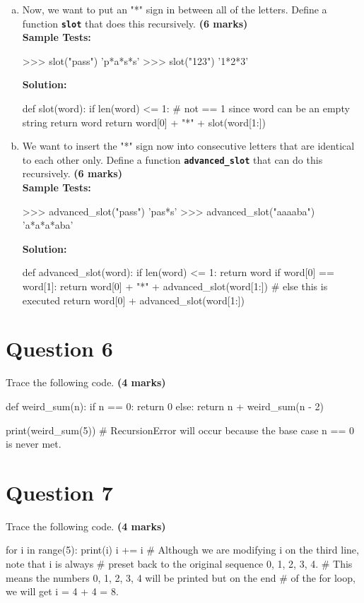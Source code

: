 \begin{enumerate}[(a)]
\item Now, we want to put an "*" sign in between all of the letters. Define a function \texttt{\bfseries slot}
that does this recursively. \textbf{(6 marks)} \\
\textbf{Sample Tests:}
\begin{python}
>>> slot("pass")
'p*a*s*s'
>>> slot("123")
'1*2*3'
\end{python}
\textbf{Solution:}
\begin{python}
def slot(word):
    if len(word) <= 1: # not == 1 since word can be an empty string
        return word
    return word[0] + "*" + slot(word[1:])
\end{python}

\item We want to insert the "*" sign now into consecutive letters that are identical to each
other only. Define a function \texttt{\bfseries advanced\_slot} that can do this recursively. \textbf{(6 marks)} \\
\textbf{Sample Tests:}
\begin{python}
>>> advanced_slot("pass")
'pas*s'
>>> advanced_slot("aaaaba")
'a*a*a*aba'
\end{python}
\textbf{Solution:}
\begin{python}
def advanced_slot(word):
    if len(word) <= 1:
        return word
    if word[0] == word[1]:
        return word[0] + "*" + advanced_slot(word[1:])
    # else this is executed
    return word[0] + advanced_slot(word[1:])
\end{python}
\end{enumerate}

\section{Question 6}
Trace the following code. \textbf{(4 marks)}
\begin{python}
def weird_sum(n):
    if n == 0:
        return 0 
    else:
        return n + weird_sum(n - 2)

print(weird_sum(5))
# RecursionError will occur because the base case n == 0 is never met.
\end{python}

\section{Question 7}
Trace the following code. \textbf{(4 marks)}
\begin{python}
for i in range(5):
    print(i)
    i += i
# Although we are modifying i on the third line, note that i is always
# preset back to the original sequence 0, 1, 2, 3, 4.
# This means the numbers 0, 1, 2, 3, 4 will be printed but on the end
# of the for loop, we will get i = 4 + 4 = 8.
\end{python}

